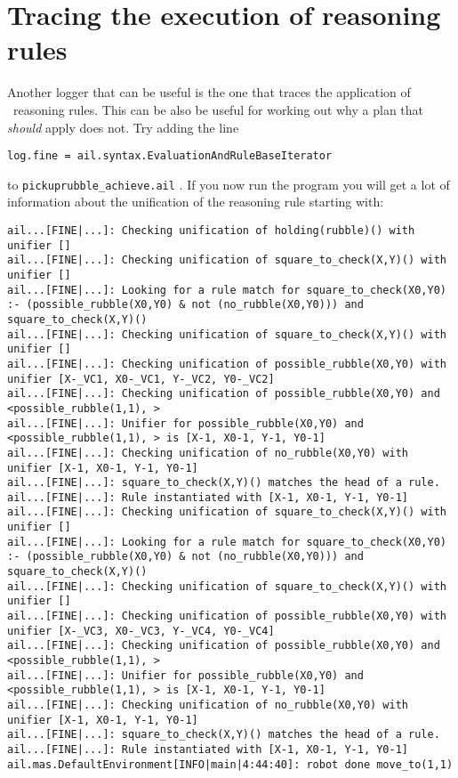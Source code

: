 \section{Tracing the execution of reasoning rules}
Another logger that can be useful is the one that traces the
application of \prolog\ reasoning rules.  This can be also be useful
for working out why a plan that \emph{should} apply does not.  Try
adding the line 
\begin{verbatim}
log.fine = ail.syntax.EvaluationAndRuleBaseIterator
\end{verbatim}
to \texttt{pickuprubble\_achieve.ail}
.  If you now run
the program you will get a lot of information about the unification of
the reasoning rule starting with: 

\begin{small}
\begin{verbatim}
ail...[FINE|...]: Checking unification of holding(rubble)() with unifier [] 
ail...[FINE|...]: Checking unification of square_to_check(X,Y)() with unifier [] 
ail...[FINE|...]: Looking for a rule match for square_to_check(X0,Y0) :- (possible_rubble(X0,Y0) & not (no_rubble(X0,Y0))) and square_to_check(X,Y)() 
ail...[FINE|...]: Checking unification of square_to_check(X,Y)() with unifier [] 
ail...[FINE|...]: Checking unification of possible_rubble(X0,Y0) with unifier [X-_VC1, X0-_VC1, Y-_VC2, Y0-_VC2] 
ail...[FINE|...]: Checking unification of possible_rubble(X0,Y0) and <possible_rubble(1,1), > 
ail...[FINE|...]: Unifier for possible_rubble(X0,Y0) and <possible_rubble(1,1), > is [X-1, X0-1, Y-1, Y0-1] 
ail...[FINE|...]: Checking unification of no_rubble(X0,Y0) with unifier [X-1, X0-1, Y-1, Y0-1] 
ail...[FINE|...]: square_to_check(X,Y)() matches the head of a rule. 
ail...[FINE|...]: Rule instantiated with [X-1, X0-1, Y-1, Y0-1] 
ail...[FINE|...]: Checking unification of square_to_check(X,Y)() with unifier [] 
ail...[FINE|...]: Looking for a rule match for square_to_check(X0,Y0) :- (possible_rubble(X0,Y0) & not (no_rubble(X0,Y0))) and square_to_check(X,Y)() 
ail...[FINE|...]: Checking unification of square_to_check(X,Y)() with unifier [] 
ail...[FINE|...]: Checking unification of possible_rubble(X0,Y0) with unifier [X-_VC3, X0-_VC3, Y-_VC4, Y0-_VC4] 
ail...[FINE|...]: Checking unification of possible_rubble(X0,Y0) and <possible_rubble(1,1), > 
ail...[FINE|...]: Unifier for possible_rubble(X0,Y0) and <possible_rubble(1,1), > is [X-1, X0-1, Y-1, Y0-1] 
ail...[FINE|...]: Checking unification of no_rubble(X0,Y0) with unifier [X-1, X0-1, Y-1, Y0-1] 
ail...[FINE|...]: square_to_check(X,Y)() matches the head of a rule. 
ail...[FINE|...]: Rule instantiated with [X-1, X0-1, Y-1, Y0-1] 
ail.mas.DefaultEnvironment[INFO|main|4:44:40]: robot done move_to(1,1) 
\end{verbatim}
\end{small}

